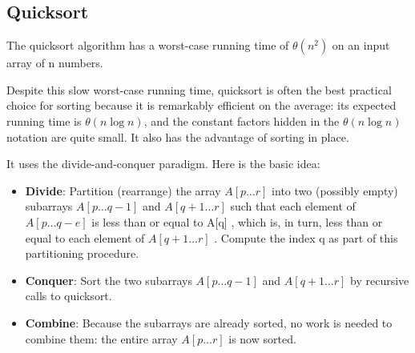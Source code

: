 \newpage

\subsection{Quicksort}

The quicksort algorithm has a worst-case running time of $\theta (n^2)$ on an input array of n numbers. 

\begin{minipage}[H]{0.72\textwidth}

    \vspace{0.5em}

    Despite this slow worst-case running time, quicksort is often the best practical choice for sorting because it is remarkably efficient on the average: its expected running time is $\theta (n\log n)$, and the constant factors hidden in the $\theta (n\log n)$ notation are quite small. It also has the advantage of sorting in place.

    \vspace{0.5em}

    It uses the divide-and-conquer paradigm. Here is the basic idea:

    \vspace{0.5em}

    \begin{itemize}
        \item \textbf{Divide}: Partition (rearrange) the array $A[p\dots r]$ into two (possibly empty) subarrays $A[p\dots q-1]$ and $A[q+1\dots r]$ such that each element of $A[p\dots q-e]$ is less than or equal to A[q] , which is, in turn, less than or equal to each element of $A[q+1\dots r]$ . Compute the index q as part of this partitioning procedure.
        \item \textbf{Conquer}: Sort the two subarrays $A[p\dots q-1]$ and $A[q+1\dots r]$ by recursive calls to quicksort.
        \item \textbf{Combine}: Because the subarrays are already sorted, no work is needed to combine them: the entire array $A[p\dots r]$ is now sorted.
    \end{itemize}
\end{minipage}%
